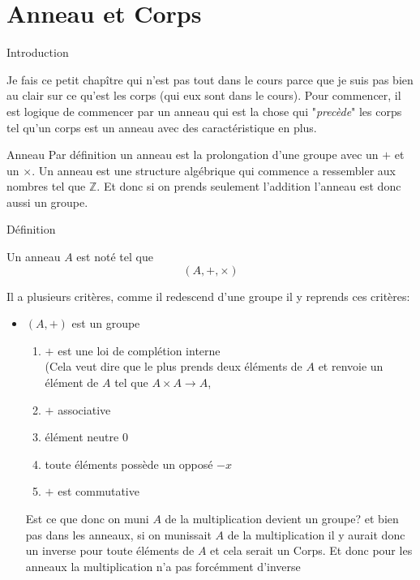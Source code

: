 \chapter{Anneau et Corps}
\begin{parag}{Introduction}
    
Je fais ce petit chapître qui n'est pas tout dans le cours parce que je suis pas bien au clair sur ce qu'est les corps (qui eux sont dans le cours). Pour commencer, il est logique de commencer par un anneau qui est la chose qui "\textit{precède}" les corps tel qu'un corps est un anneau avec des caractéristique en plus.
\end{parag}

\begin{parag}{Anneau}
    Par définition un anneau est la prolongation d'une groupe avec un $+$ et un $\times$. Un anneau est une structure algébrique qui commence a ressembler aux nombres tel que $\mathbb{Z}$. Et donc si on prends seulement l'addition l'anneau est donc aussi un groupe.
    \begin{subparag}{Définition}
        \begin{definition}
            Un anneau $A$ est noté tel que
            \[(A, +, \times)\]
        \end{definition}
        Il a plusieurs critères, comme il redescend d'une groupe il y reprends ces critères: 
        \begin{itemize}
            \item $(A, +)$ est un groupe
            \begin{enumerate}
                \item $+$ est une loi de complétion interne
                \\
                (Cela veut dire que le plus prends deux éléments de $A$ et renvoie un élément de $A$ tel que $A \times A \to A$,
                \item $+$ associative
                \item élément neutre $0$
                \item toute éléments possède un opposé $-x$
                \item $+$ est commutative
            \end{enumerate}
            Est ce que donc on muni $A$ de la multiplication devient un groupe? et bien pas dans les anneaux, si on munissait $A$ de la multiplication il y aurait donc un inverse pour toute éléments de $A$ et cela serait un Corps. Et donc pour les anneaux la multiplication n'a pas forcémment d'inverse

\end{itemize}
\end{subparag}
\end{parag}
